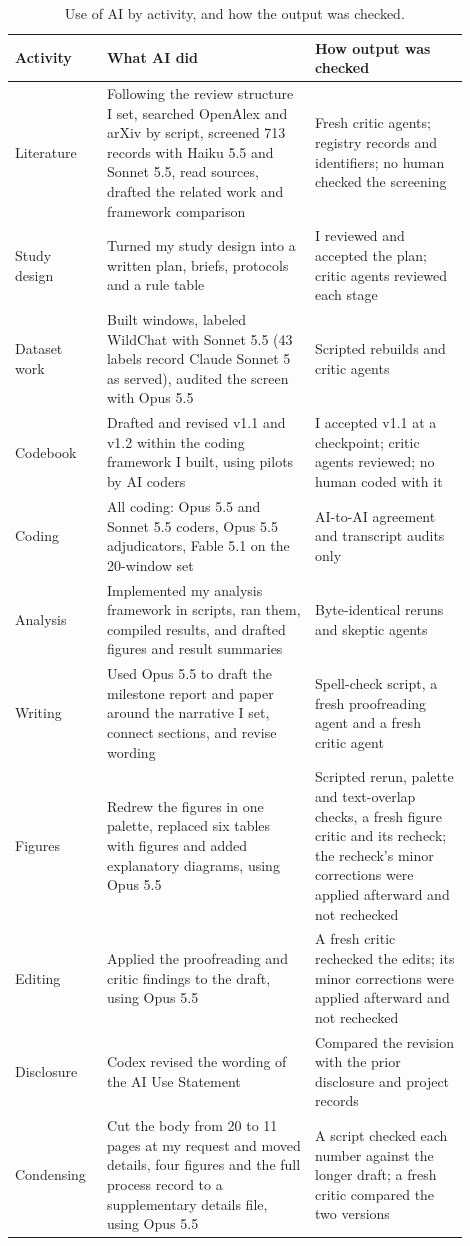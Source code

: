 \documentclass[manuscript,screen]{acmart}
\begin{document}
\begin{table}[H]
\caption{Use of AI by activity, and how the output was checked.}
\label{tab:aiuse}
\footnotesize
\begin{tabular}{p{0.17\linewidth}p{0.42\linewidth}p{0.31\linewidth}}
\toprule
Activity & What AI did & How output was checked \\
\midrule
Literature & Following the review structure I set, searched OpenAlex and arXiv by script, screened 713 records with Haiku 5.5 and Sonnet 5.5, read sources, drafted the related work and framework comparison & Fresh critic agents; registry records and identifiers; no human checked the screening \\
Study design & Turned my study design into a written plan, briefs, protocols and a rule table & I reviewed and accepted the plan; critic agents reviewed each stage \\
Dataset work & Built windows, labeled WildChat with Sonnet 5.5 (43 labels record Claude Sonnet 5 as served), audited the screen with Opus 5.5 & Scripted rebuilds and critic agents \\
Codebook & Drafted and revised v1.1 and v1.2 within the coding framework I built, using pilots by AI coders & I accepted v1.1 at a checkpoint; critic agents reviewed; no human coded with it \\
Coding & All coding: Opus 5.5 and Sonnet 5.5 coders, Opus 5.5 adjudicators, Fable 5.1 on the 20-window set & AI-to-AI agreement and transcript audits only \\
Analysis & Implemented my analysis framework in scripts, ran them, compiled results, and drafted figures and result summaries & Byte-identical reruns and skeptic agents \\
Writing & Used Opus 5.5 to draft the milestone report and paper around the narrative I set, connect sections, and revise wording & Spell-check script, a fresh proofreading agent and a fresh critic agent \\
Figures & Redrew the figures in one palette, replaced six tables with figures and added explanatory diagrams, using Opus 5.5 & Scripted rerun, palette and text-overlap checks, a fresh figure critic and its recheck; the recheck's minor corrections were applied afterward and not rechecked \\
Editing & Applied the proofreading and critic findings to the draft, using Opus 5.5 & A fresh critic rechecked the edits; its minor corrections were applied afterward and not rechecked \\
Disclosure & Codex revised the wording of the AI Use Statement & Compared the revision with the prior disclosure and project records \\
Condensing & Cut the body from 20 to 11 pages at my request and moved details, four figures and the full process record to a supplementary details file, using Opus 5.5 & A script checked each number against the longer draft; a fresh critic compared the two versions \\
\bottomrule
\end{tabular}
\end{table}
\end{document}
